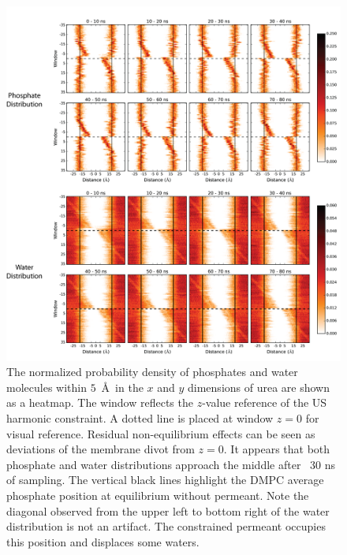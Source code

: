\documentclass[usetitle=true,journal=jcisd8,manuscript=suppinfo,biochem=true]{achemso}
\begin{document}
\begin{figure}[htbp]
\begin{center}
	\includegraphics[width=\textwidth]{Figures/distributions1}
	\caption{The normalized probability density of phosphates and water molecules within $5$~\AA\, in the $x$ and $y$ dimensions of urea are shown as a heatmap. The window reflects the $z$-value reference of the US harmonic constraint. A dotted line is placed at window $z=0$ for visual reference. Residual non-equilibrium effects can be seen as deviations of the membrane divot from $z=0$. It appears that both phosphate and water distributions approach the middle after ~30 ns of sampling. The vertical black lines highlight the DMPC average phosphate position at equilibrium without permeant. Note the diagonal observed from the upper left to bottom right of the water distribution is not an artifact. The constrained permeant occupies this position and displaces some waters.}
	\label{fig:distributions}
\end{center}
\end{figure}
\end{document}
